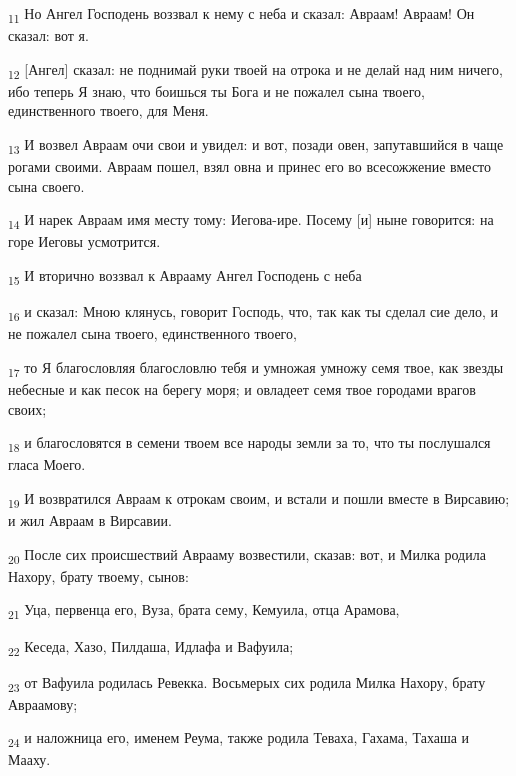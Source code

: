 \begin{tcolorbox}
\textsubscript{11} Но Ангел Господень воззвал к нему с неба и сказал: Авраам! Авраам! Он сказал: вот я.
\end{tcolorbox}
\begin{tcolorbox}
\textsubscript{12} [Ангел] сказал: не поднимай руки твоей на отрока и не делай над ним ничего, ибо теперь Я знаю, что боишься ты Бога и не пожалел сына твоего, единственного твоего, для Меня.
\end{tcolorbox}
\begin{tcolorbox}
\textsubscript{13} И возвел Авраам очи свои и увидел: и вот, позади овен, запутавшийся в чаще рогами своими. Авраам пошел, взял овна и принес его во всесожжение вместо сына своего.
\end{tcolorbox}
\begin{tcolorbox}
\textsubscript{14} И нарек Авраам имя месту тому: Иегова-ире. Посему [и] ныне говорится: на горе Иеговы усмотрится.
\end{tcolorbox}
\begin{tcolorbox}
\textsubscript{15} И вторично воззвал к Аврааму Ангел Господень с неба
\end{tcolorbox}
\begin{tcolorbox}
\textsubscript{16} и сказал: Мною клянусь, говорит Господь, что, так как ты сделал сие дело, и не пожалел сына твоего, единственного твоего,
\end{tcolorbox}
\begin{tcolorbox}
\textsubscript{17} то Я благословляя благословлю тебя и умножая умножу семя твое, как звезды небесные и как песок на берегу моря; и овладеет семя твое городами врагов своих;
\end{tcolorbox}
\begin{tcolorbox}
\textsubscript{18} и благословятся в семени твоем все народы земли за то, что ты послушался гласа Моего.
\end{tcolorbox}
\begin{tcolorbox}
\textsubscript{19} И возвратился Авраам к отрокам своим, и встали и пошли вместе в Вирсавию; и жил Авраам в Вирсавии.
\end{tcolorbox}
\begin{tcolorbox}
\textsubscript{20} После сих происшествий Аврааму возвестили, сказав: вот, и Милка родила Нахору, брату твоему, сынов:
\end{tcolorbox}
\begin{tcolorbox}
\textsubscript{21} Уца, первенца его, Вуза, брата сему, Кемуила, отца Арамова,
\end{tcolorbox}
\begin{tcolorbox}
\textsubscript{22} Кеседа, Хазо, Пилдаша, Идлафа и Вафуила;
\end{tcolorbox}
\begin{tcolorbox}
\textsubscript{23} от Вафуила родилась Ревекка. Восьмерых сих родила Милка Нахору, брату Авраамову;
\end{tcolorbox}
\begin{tcolorbox}
\textsubscript{24} и наложница его, именем Реума, также родила Теваха, Гахама, Тахаша и Мааху.
\end{tcolorbox}

